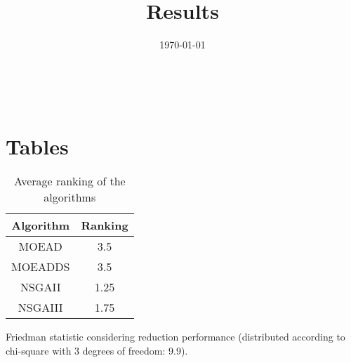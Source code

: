 \documentclass{article}
\title{Results}
\author{}
\date{\today}
\begin{document}
\oddsidemargin 0in \topmargin 0in\maketitle
\
\section{Tables}
\begin{table}[!htp]
\centering
\caption{Average ranking of the algorithms}
\begin{tabular}{c|c}
Algorithm&Ranking\\
\hline
MOEAD&3.5\\
MOEADDS&3.5\\
NSGAII&1.25\\
NSGAIII&1.75\\
\end{tabular}
\end{table}


Friedman statistic considering reduction performance (distributed according to chi-square with 3 degrees of freedom: 9.9).
\end{document}
